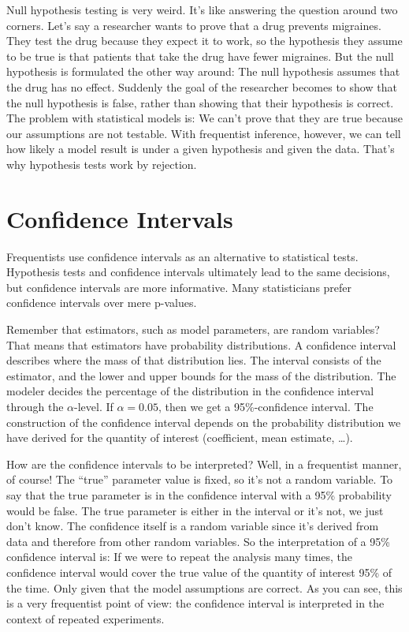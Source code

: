 \documentclass[
  10pt,
]{scrbook}
\begin{document}
Null hypothesis testing is very weird.
It's like answering the question around two corners.
Let's say a researcher wants to prove that a drug prevents migraines.
They test the drug because they expect it to work, so the hypothesis they assume to be true is that patients that take the drug have fewer migraines.
But the null hypothesis is formulated the other way around:
The null hypothesis assumes that the drug has no effect.
Suddenly the goal of the researcher becomes to show that the null hypothesis is false, rather than showing that their hypothesis is correct.
The problem with statistical models is: We can't prove that they are true because our assumptions are not testable.
With frequentist inference, however, we can tell how likely a model result is under a given hypothesis and given the data.
That's why hypothesis tests work by rejection.

\hypertarget{confidence-intervals}{%
\section{Confidence Intervals}\label{confidence-intervals}}

Frequentists use confidence intervals as an alternative to statistical tests.
Hypothesis tests and confidence intervals ultimately lead to the same decisions, but confidence intervals are more informative.
Many statisticians prefer confidence intervals over mere p-values.

Remember that estimators, such as model parameters, are random variables?
That means that estimators have probability distributions.
A confidence interval describes where the mass of that distribution lies.
The interval consists of the estimator, and the lower and upper bounds for the mass of the distribution.
The modeler decides the percentage of the distribution in the confidence interval through the \(\alpha\)-level.
If \(\alpha = 0.05\), then we get a 95\%-confidence interval.
The construction of the confidence interval depends on the probability distribution we have derived for the quantity of interest (coefficient, mean estimate, \ldots).

How are the confidence intervals to be interpreted?
Well, in a frequentist manner, of course!
The ``true'' parameter value is fixed, so it's not a random variable.
To say that the true parameter is in the confidence interval with a 95\% probability would be false.
The true parameter is either in the interval or it's not, we just don't know.
The confidence itself is a random variable since it's derived from data and therefore from other random variables.
So the interpretation of a 95\% confidence interval is:
If we were to repeat the analysis many times, the confidence interval would cover the true value of the quantity of interest 95\% of the time.
Only given that the model assumptions are correct.
As you can see, this is a very frequentist point of view: the confidence interval is interpreted in the context of repeated experiments.
\end{document}
